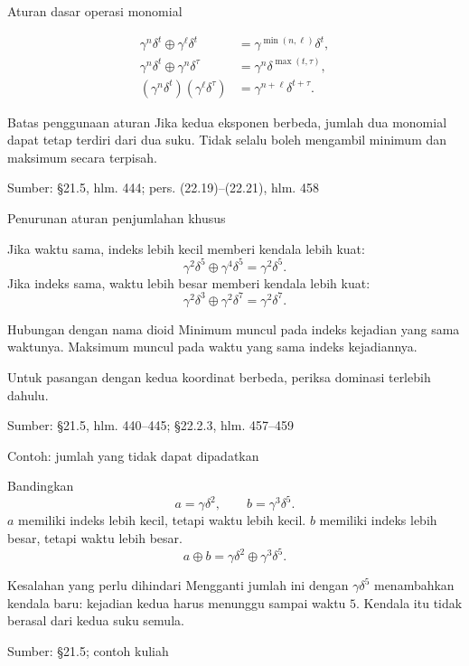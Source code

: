 \documentclass[aspectratio=169,11pt]{beamer}
\newcommand{\source}[1]{%
    \vfill
    \hfill{\tiny\color{gray}Sumber: #1}
}
\begin{document}
\begin{frame}{Aturan dasar operasi monomial}


\begin{align*}
\gamma^n\delta^t\oplus\gamma^\ell\delta^t
&=\gamma^{\min(n,\ell)}\delta^t,\\
\gamma^n\delta^t\oplus\gamma^n\delta^\tau
&=\gamma^n\delta^{\max(t,\tau)},\\
(\gamma^n\delta^t)(\gamma^\ell\delta^\tau)
&=\gamma^{n+\ell}\delta^{t+\tau}.
\end{align*}
\begin{block}{Batas penggunaan aturan}
Jika kedua eksponen berbeda, jumlah dua monomial dapat tetap terdiri dari dua suku.
Tidak selalu boleh mengambil minimum dan maksimum secara terpisah.
\end{block}

\source{\S21.5, hlm. 444; pers. (22.19)--(22.21), hlm. 458}

\end{frame}
\begin{frame}{Penurunan aturan penjumlahan khusus}

Jika waktu sama, indeks lebih kecil memberi kendala lebih kuat:
\[
\gamma^2\delta^5\oplus\gamma^4\delta^5=\gamma^2\delta^5.
\]
Jika indeks sama, waktu lebih besar memberi kendala lebih kuat:
\[
\gamma^2\delta^3\oplus\gamma^2\delta^7=\gamma^2\delta^7.
\]
\begin{exampleblock}{Hubungan dengan nama dioid}
Minimum muncul pada indeks kejadian yang sama waktunya.
Maksimum muncul pada waktu yang sama indeks kejadiannya.
\end{exampleblock}
Untuk pasangan dengan kedua koordinat berbeda, periksa dominasi terlebih dahulu.

\source{\S21.5, hlm. 440--445; \S22.2.3, hlm. 457--459}
\end{frame}
\begin{frame}{Contoh: jumlah yang tidak dapat dipadatkan}


Bandingkan
\[
a=\gamma\delta^2,\qquad b=\gamma^3\delta^5.
\]
$a$ memiliki indeks lebih kecil, tetapi waktu lebih kecil.
$b$ memiliki indeks lebih besar, tetapi waktu lebih besar.
\[
a\oplus b=\gamma\delta^2\oplus\gamma^3\delta^5.
\]
\begin{block}{Kesalahan yang perlu dihindari}
Mengganti jumlah ini dengan $\gamma\delta^5$ menambahkan kendala baru:
kejadian kedua harus menunggu sampai waktu $5$.
Kendala itu tidak berasal dari kedua suku semula.
\end{block}

\source{\S21.5; contoh kuliah}

\end{frame}
\end{document}
